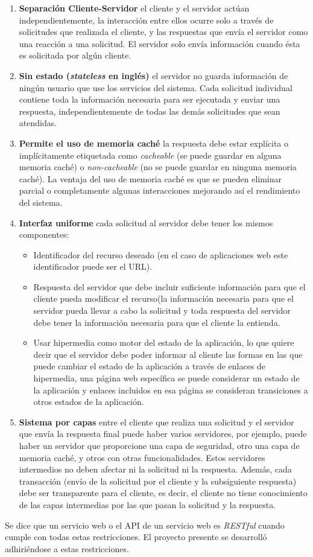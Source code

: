\begin{enumerate}
   \item \textbf{Separación Cliente-Servidor} el cliente y el servidor actúan independientemente, la interacción entre ellos ocurre solo a través de solicitudes que realizada el cliente, y las respuestas que envía el servidor como una reacción a una solicitud. El servidor solo envía información cuando ésta es solicitada por algún cliente.
   \item \textbf{Sin estado (\emph{stateless} en inglés)} el servidor no guarda información de ningún usuario que use los servicios del sistema. Cada solicitud individual contiene toda la información necesaria para ser ejecutada y enviar una respuesta, independientemente de todas las demás solicitudes que sean atendidas.
   \item \textbf{Permite el uso de memoria caché} la respuesta debe estar explícita o implícitamente etiquetada como \textit{cacheable} (se puede guardar en alguna memoria caché) o \textit{non-cacheable} (no se puede guardar en ninguna memoria caché). La ventaja del uso de memoria caché es que se pueden eliminar parcial o completamente algunas interacciones mejorando así el rendimiento del sistema.
   \item \textbf{Interfaz uniforme} cada solicitud al servidor debe tener los mismos componentes:
        \begin{itemize}
            \item Identificador del recurso deseado (en el caso de aplicaciones web este identificador puede ser el URL).
            \item Respuesta del servidor que debe incluir suficiente información para que el cliente pueda modificar el recurso(la información necesaria para que el servidor pueda llevar a cabo la solicitud y toda respuesta del servidor debe tener la información necesaria para que el cliente la entienda.
            \item Usar hipermedia como motor del estado de la aplicación, lo que quiere decir que el servidor debe poder informar al cliente las formas en las que puede cambiar el estado de la aplicación a través de enlaces de hipermedia, una página web específica se puede considerar un estado de la aplicación y enlaces incluidos en esa página se consideran transiciones a otros estados de la aplicación.
        \end{itemize}
    \item \textbf{Sistema por capas} entre el cliente que realiza una solicitud y el servidor que envía la respuesta final puede haber varios servidores, por ejemplo, puede haber un servidor que proporcione una capa de seguridad, otro una capa de memoria caché, y otros con otras funcionalidades. Estos servidores intermedios no deben afectar ni la solicitud ni la respuesta. Además, cada transacción (envío de la solicitud por el cliente y la subsiguiente respuesta) debe ser transparente para el cliente, es decir, el cliente no tiene conocimiento de las capas intermedias por las que pasan la solicitud y la respuesta.
\end{enumerate}

Se dice que un servicio web o el API de un servicio web es \textit{RESTful} cuando cumple con todas estas restricciones. El proyecto presente se desarrolló adhiriéndose a estas restricciones.
